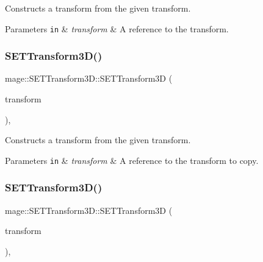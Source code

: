 Constructs a transform from the given transform.


\begin{DoxyParams}[1]{Parameters}
\mbox{\tt in}  & {\em transform} & A reference to the transform. \\
\hline
\end{DoxyParams}
\mbox{\label{classmage_1_1_s_e_t_transform3_d_aa0a9be5e7a9d673206bbfceaa7b4826f}} 
\subsubsection{\texorpdfstring{S\+E\+T\+Transform3\+D()}{SETTransform3D()}\hspace{0.1cm}{\footnotesize\ttfamily [4/5]}}
{\footnotesize\ttfamily mage\+::\+S\+E\+T\+Transform3\+D\+::\+S\+E\+T\+Transform3D (\begin{DoxyParamCaption}\item[{const \mbox{\hyperlink{classmage_1_1_s_e_t_transform3_d}{S\+E\+T\+Transform3D}} \&}]{transform }\end{DoxyParamCaption})\hspace{0.3cm}{\ttfamily [default]}, {\ttfamily [noexcept]}}

Constructs a transform from the given transform.


\begin{DoxyParams}[1]{Parameters}
\mbox{\tt in}  & {\em transform} & A reference to the transform to copy. \\
\hline
\end{DoxyParams}
\mbox{\label{classmage_1_1_s_e_t_transform3_d_a76ee2cf7903877774c98c206bc52127f}} 
\subsubsection{\texorpdfstring{S\+E\+T\+Transform3\+D()}{SETTransform3D()}\hspace{0.1cm}{\footnotesize\ttfamily [5/5]}}
{\footnotesize\ttfamily mage\+::\+S\+E\+T\+Transform3\+D\+::\+S\+E\+T\+Transform3D (\begin{DoxyParamCaption}\item[{\mbox{\hyperlink{classmage_1_1_s_e_t_transform3_d}{S\+E\+T\+Transform3D}} \&\&}]{transform }\end{DoxyParamCaption})\hspace{0.3cm}{\ttfamily [default]}, {\ttfamily [noexcept]}}

